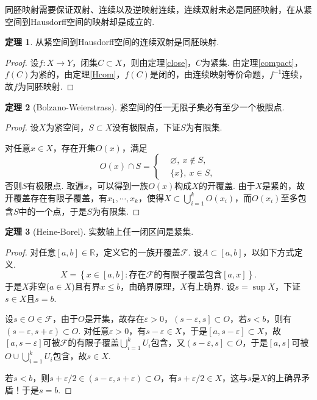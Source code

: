 \documentclass[12pt]{ctexart}
\theoremstyle{definition}
\newtheorem{theorem}{定理}
\theoremstyle{plain}
\begin{document}
	同胚映射需要保证双射、连续以及逆映射连续，连续双射未必是同胚映射，在从紧空间到Hausdorff空间的映射却是成立的.
	\begin{theorem}
		从紧空间到Hausdorff空间的连续双射是同胚映射.
	\end{theorem}
	\begin{proof}
		设$f:X\to Y$，闭集$C\subset X$，则由定理\ref{close}，$C$为紧集. 由定理\ref{compact}，$f(C)$为紧的，由定理\ref{Hcom}，$f(C)$是闭的，由连续映射等价命题，$f^{-1}$连续，故$f$为同胚映射.
	\end{proof}
	\begin{theorem}[Bolzano-Weierstrass]
		紧空间的任一无限子集必有至少一个极限点.
	\end{theorem}
	\begin{proof}
		设$X$为紧空间，$S\subset X$没有极限点，下证$S$为有限集.
		
		对任意$x\in X$，存在开集$O(x)$，满足
		\begin{equation*}
			O(x)\cap S=\left\{
			\begin{aligned}
				&\varnothing,\ x\notin S,\\
				&\{x\},\ x\in S,
			\end{aligned}
			\right.
		\end{equation*}
		否则$S$有极限点. 取遍$x$，可以得到一族$O(x)$构成$X$的开覆盖. 由于$X$是紧的，故开覆盖存在有限子覆盖，有$x_1,\cdots,x_k$，使得$X\subset\bigcup_{i=1}^{k}O(x_i)$，而$O(x_i)$至多包含$S$中的一个点，于是$S$为有限集.
	\end{proof}
	\begin{theorem}[Heine-Borel]
		实数轴上任一闭区间是紧集.
	\end{theorem}
	\begin{proof}
		对任意$\left[a,b\right]\in\mathbb{R}$，定义它的一族开覆盖$\mathcal{F}$. 设$A\subset \left[a,b\right]$，以如下方式定义.
		$$X=\left\{x\in\left[a,b\right]:\text{存在}\mathcal{F}\text{的有限子覆盖包含}\left[a,x\right]\right\}.$$
		于是$X$非空($a\in X$)且有界$x\leqslant b$，由确界原理，$X$有上确界. 设$s=\sup X$，下证$s\in X$且$s=b$.
		
		设$s\in O\in\mathcal{F}$，由于$O$是开集，故存在$\varepsilon>0$，$\left(s-\varepsilon,s\right]\subset O$，若$s<b$，则有$(s-\varepsilon,s+\varepsilon)\subset O$. 对任意$\varepsilon>0$，有$s-\varepsilon\in X$，于是$\left[a,s-\varepsilon\right]\subset X$，故$\left[a,s-\varepsilon\right]$可被$\mathcal{F}$的有限子覆盖$\bigcup_{i=1}^{k}U_i$包含，又$\left(s-\varepsilon,s\right]\subset O$，于是$\left[a,s\right]$可被$O\cup\bigcup_{i=1}^{k}U_i$包含，故$s\in X$.
		
		若$s<b$，则$s+\varepsilon/2\in(s-\varepsilon,s+\varepsilon)\subset O$，有$s+\varepsilon/2\in X$，这与$s$是$X$的上确界矛盾！于是$s=b$.
	\end{proof}
\end{document}
